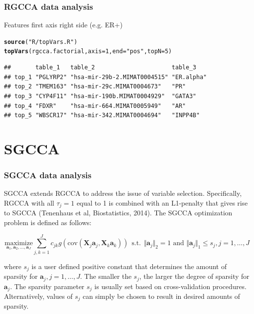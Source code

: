 \documentclass[10pt,xcolor=dvipsnames]{beamer}\usepackage[]{graphicx}\usepackage[]{color}
\makeatletter
\newcommand{\hlnum}[1]{\textcolor[rgb]{0.686,0.059,0.569}{#1}}%
\newcommand{\hlstr}[1]{\textcolor[rgb]{0.192,0.494,0.8}{#1}}%
\newcommand{\hlstd}[1]{\textcolor[rgb]{0.345,0.345,0.345}{#1}}%
\newcommand{\hlkwc}[1]{\textcolor[rgb]{0.333,0.667,0.333}{#1}}%
\newcommand{\hlkwd}[1]{\textcolor[rgb]{0.737,0.353,0.396}{\textbf{#1}}}%
\newenvironment{kframe}{%
 \def\at@end@of@kframe{}%
 \ifinner\ifhmode%
  \def\at@end@of@kframe{\end{minipage}}%
  \begin{minipage}{\columnwidth}%
 \fi\fi%
 \def\FrameCommand##1{\hskip\@totalleftmargin \hskip-\fboxsep
 \colorbox{shadecolor}{##1}\hskip-\fboxsep
     \hskip-\linewidth \hskip-\@totalleftmargin \hskip\columnwidth}%
 \MakeFramed {\advance\hsize-\width
   \@totalleftmargin\z@ \linewidth\hsize
   \@setminipage}}%
 {\par\unskip\endMakeFramed%
 \at@end@of@kframe}
\newenvironment{knitrout}{}{} %
\newcommand{\X}{\mathbf{X}}
\newcommand{\ma}[1]{\ensuremath{\mathbf{#1}}}
\newcommand{\mba}{\mathbf{a}}
\makeatother
\begin{document}
\begin{frame}\frametitle{RGCCA data analysis}

Features first axis right side (e.g. ER+)

\begin{knitrout}\footnotesize
{}\color{fgcolor}\begin{kframe}
\begin{alltt}
\hlkwd{source}\hlstd{(}\hlstr{"R/topVars.R"}\hlstd{)}
\hlkwd{topVars}\hlstd{(rgcca.factorial,} \hlkwc{axis}\hlstd{=}\hlnum{1}\hlstd{,} \hlkwc{end}\hlstd{=}\hlstr{"pos"}\hlstd{,} \hlkwc{topN}\hlstd{=}\hlnum{5}\hlstd{)}
\end{alltt}
\begin{verbatim}
##       table_1   table_2                      table_3   
## top_1 "PGLYRP2" "hsa-mir-29b-2.MIMAT0004515" "ER.alpha"
## top_2 "TMEM163" "hsa-mir-29c.MIMAT0004673"   "PR"      
## top_3 "CYP4F11" "hsa-mir-190b.MIMAT0004929"  "GATA3"   
## top_4 "FDXR"    "hsa-mir-664.MIMAT0005949"   "AR"      
## top_5 "WBSCR17" "hsa-mir-342.MIMAT0004694"   "INPP4B"
\end{verbatim}
\end{kframe}
\end{knitrout}

\end{frame}


\section{SGCCA}

\begin{frame}\frametitle{SGCCA data analysis}

SGCCA extends RGCCA to address the issue of variable selection. Specifically, RGCCA with all $\tau_j=1$ equal to 1 is combined with an L1-penalty that gives rise to SGCCA (Tenenhaus et al, Biostatistics, 2014). The SGCCA optimization problem is defined as follows:

\begin{equation*}
\displaystyle \underset{\mba_1,\mba_2, \ldots,\mba_J}{\text{maximize}} \sum_{j, k = 1}^J c_{jk}g(\mathrm{cov}(\X_j\ma a_j, \X_k\ma a_k)) \mathrm{~~s.t.~~} \Vert \mba_j \Vert_2 = 1 \text{~and~} \Vert \mba_j \Vert_1 \le s_j, j=1,\ldots,J
\label{optim_SGCCA}
\end{equation*}

where $s_j$ is a user defined positive constant that determines the amount of sparsity for $\ma a_j, j=1, \ldots,J$. The smaller the $s_j$, the larger the degree of sparsity for $\ma a_j$.  The sparsity parameter $s_j$  is usually set based on cross-validation procedures. Alternatively, values of $s_j$ can simply be chosen to result in desired amounts of sparsity.


\end{frame}
\end{document}
